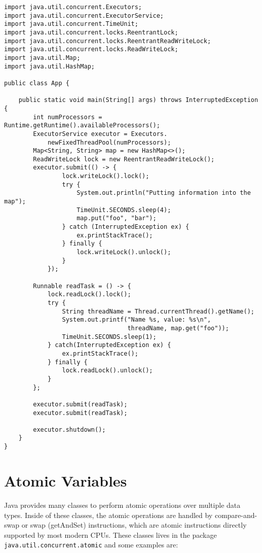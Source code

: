 \documentclass{latex/classes/myarticle}
\begin{document}
\begin{lstlisting}
import java.util.concurrent.Executors;
import java.util.concurrent.ExecutorService;
import java.util.concurrent.TimeUnit;
import java.util.concurrent.locks.ReentrantLock;
import java.util.concurrent.locks.ReentrantReadWriteLock;
import java.util.concurrent.locks.ReadWriteLock;
import java.util.Map;
import java.util.HashMap;

public class App {

    public static void main(String[] args) throws InterruptedException {
        int numProcessors = Runtime.getRuntime().availableProcessors();
        ExecutorService executor = Executors.
            newFixedThreadPool(numProcessors);
        Map<String, String> map = new HashMap<>();
        ReadWriteLock lock = new ReentrantReadWriteLock();
        executor.submit(() -> {
                lock.writeLock().lock();
                try {
                    System.out.println("Putting information into the map");
                    TimeUnit.SECONDS.sleep(4);
                    map.put("foo", "bar");
                } catch (InterruptedException ex) {
                    ex.printStackTrace();
                } finally {
                    lock.writeLock().unlock();
                }
            });

        Runnable readTask = () -> {
            lock.readLock().lock();
            try {
                String threadName = Thread.currentThread().getName();
                System.out.printf("Name %s, value: %s\n",
                                  threadName, map.get("foo"));
                TimeUnit.SECONDS.sleep(1);
            } catch(InterruptedException ex) {
                ex.printStackTrace();
            } finally {
                lock.readLock().unlock();
            }
        };

        executor.submit(readTask);
        executor.submit(readTask);

        executor.shutdown();
    }
}
\end{lstlisting}

\section{Atomic Variables}
\label{sec:org4bf8fa4}

Java provides many classes to perform atomic operations over multiple data
types. Inside of these classes, the atomic operations are handled by
compare-and-swap or swap (getAndSet) instructions, which are atomic
instructions directly supported by most modern CPUs. These classes lives in
the package \texttt{java.util.concurrent.atomic} and some examples are:
\end{document}
